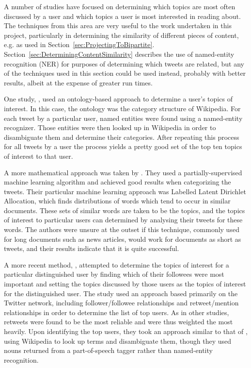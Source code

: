 A number of studies have focused on determining which topics are most often discussed by a user and which topics a user is most interested in reading about. The techniques from this area are very useful to the work undertaken in this project, particularly in determining the similarity of different pieces of content, e.g. as used in Section~\ref{sec:ProjectingToBipartite}. Section~\ref{sec:DeterminingContentSimilarity} describes the use of named-entity recognition (NER) for purposes of determining which tweets are related, but any of the techniques used in this section could be used instead, probably with better results, albeit at the expense of greater run times.

One study, \cite{Michelson2010}, used an ontology-based approach to determine a user's topics of interest. In this case, the ontology was the category structure of Wikipedia. For each tweet by a particular user, named entities were found using a named-entity recognizer. Those entities were then looked up in Wikipedia in order to disambiguate them and determine their categories. After repeating this process for all tweets by a user the process yields a pretty good set of the top ten topics of interest to that user.

A more mathematical approach was taken by \cite{Ramage2010}. They used a partially-supervised machine learning algorithm and achieved good results when categorizing the tweets. Their particular machine learning approach was Labelled Latent Dirichlet Allocation, which finds distributions of words which tend to occur in similar documents. These sets of similar words are taken to be the topics, and the topics of interest to particular users can determined by analysing their tweets for these words. The authors were unsure at the outset if this technique, commonly used for long documents such as news articles, would work for documents as short as tweets, and their results indicate that it is quite successful.

A more recent method, \cite{Pochampally2011}, attempted to determine the topics of interest for a particular distinguished user by finding which of their followees were most important and setting the topics discussed by those users as the topics of interest for the distinguished user. The study used an approach based primarily on the Twitter network, including follower/followee relationships and retweet/mention relationships in order to determine the list of top users. As in other studies, retweets were found to be the most reliable and were thus weighted the most heavily. Upon identifying the top users, they took an approach similar to that of \cite{Michelson2010}, using Wikipedia to look up terms and disambiguate them, though they used nouns returned from a part-of-speech tagger rather than named-entity recognition.


